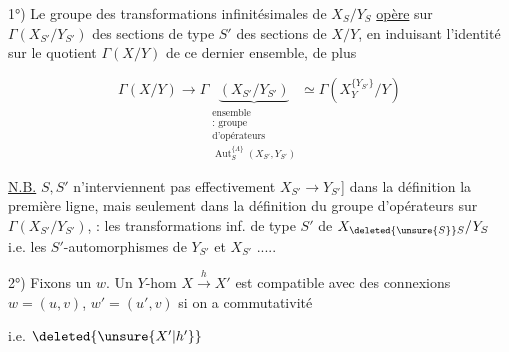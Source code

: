 1°) Le groupe des transformations infinitésimales  de $X_S/Y_S$ \uline{opère} sur $\Gamma(X_{S'}/Y_{S'})$ des sections  de type $S'$ des sections de $X/Y$, en induisant l'identité sur le quotient $\Gamma(X/Y)$ de ce dernier ensemble, de plus

\[
\Gamma(X/Y)\longrightarrow
\Gamma\underbrace{(X_{S'}/Y_{S'})}_{\substack{\text{ensemble}\\
\text{: groupe}\\ \text{d'opérateurs}\\
\operatorname{Aut}^{\{\Lambda\}}_{S}(X_{S'},Y_{S'})}}
\simeq\Gamma(X_Y^{\{Y_{S'}\}}/Y)
\]

\uline{N.B.} $S,S'$ n'interviennent pas effectivement  \inserted{[\unsure{seult|seulement} par} $X_{S'}\to Y_{S'}$] dans la définition  la première ligne, mais seulement dans la définition du groupe d'opérateurs sur $\Gamma(X_{S'}/Y_{S'})$, : les transformations inf. de type $S'$ de $X_{\deleted{\unsure{S}}S}/Y_S$ i.e. les $S'$-automorphismes de $Y_{S'}$ et $X_{S'}$ .....

2°) Fixons un $w$. Un $Y$-hom $\displaystyle X\xrightarrow{h}X'$ est compatible avec des connexions $w=(u,v)$, $w'=(u',v)$ si on a commutativité 

\hfill i.e. $\deleted{\unsure{X'|h'}}$ 


